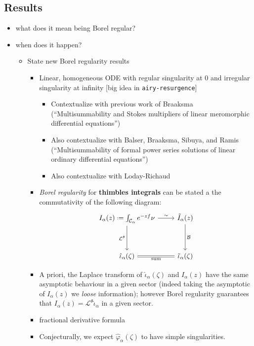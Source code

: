 \documentclass{article}
\newcommand*{\defeq}{\mathrel{\vcenter{\baselineskip0.5ex \lineskiplimit0pt
                     \hbox{\scriptsize.}\hbox{\scriptsize.}}}%
                     =}
\begin{document}
\subsection{Results}

\color{orange}
\begin{itemize}
\item what does it mean being Borel regular?
\item when does it happen?
\begin{itemize}
\item State new Borel regularity results
\begin{itemize}
\item Linear, homogeneous ODE with regular singularity at 0 and irregular singularity at infinity [big idea in {\tt airy-resurgence}]
\begin{itemize}
\item Contextualize with previous work of Braaksma (``Multisummability and Stokes multipliers of linear meromorphic differential equations'')
\item Also contextualize with Balser, Braaksma, Sibuya, and Ramis (``Multisummability of formal power series solutions of linear ordinary differential equations'')
\item Also contextualize with Loday-Richaud
\end{itemize}
\item \emph{Borel regularity} for \textbf{thimbles integrals} can be stated a the commutativity of the following diagram:
\begin{equation}
\begin{tikzcd}
I_{\alpha}(z)\defeq\int_{\mathcal{C}_\alpha}e^{-zf}\nu \arrow[r,"\sim"]\arrow[dd, swap, "\mathcal{L}^\theta "] & \tilde{I}_{\alpha}(z)\arrow[dd,"\mathcal{B}"]\\
& \\
\hat{\iota}_\alpha(\zeta)\arrow[r,equal,swap, "\text{sum}"] & \tilde{\iota}_{\alpha}(\zeta) 
\end{tikzcd}
\end{equation}
\item A priori, the Laplace transform of $\hat{\iota}_\alpha(\zeta)$ and $I_{\alpha}(z)$ have the same asymptotic behaviour in a given sector (indeed taking the asymptotic of $I_\alpha(z)$ we \textit{loose} information); however Borel regularity guarantees that $I_{\alpha}(z)=\mathcal{L}^{\theta}\hat{\iota}_{\alpha}$ in a given sector.
\item fractional derivative formula
\item Conjecturally, we expect $\hat{\varphi}_\alpha(\zeta)$ to have simple singularities. 

\end{itemize}
\end{itemize}
\end{itemize}
\end{document}
